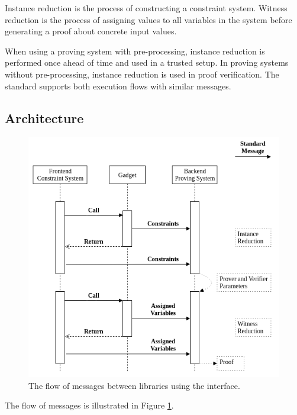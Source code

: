 
	Instance reduction is the process of constructing a constraint system.
	Witness reduction is the process of assigning values to all variables
	in the system before generating a proof about concrete input values.

	When using a proving system with pre-processing, instance reduction
	is performed once ahead of time and used in a trusted setup.
	In proving systems without pre-processing, instance reduction is used in proof verification.
	The standard supports both execution flows with similar messages.

\subsection{Architecture}

\begin{figure}[!h]
	\centering
	\includegraphics[width=\linewidth]{graphics/call_flow.png}
	\caption{The flow of messages between libraries using the interface.}
	\label{flow}
\end{figure}


	The flow of messages is illustrated in Figure \ref{flow}.

